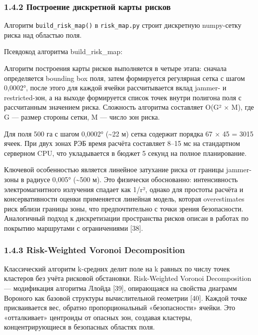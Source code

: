 \documentclass[14pt,a4paper]{extarticle}
\begin{document}
\hypertarget{ux43fux43eux441ux442ux440ux43eux435ux43dux438ux435-ux434ux438ux441ux43aux440ux435ux442ux43dux43eux439-ux43aux430ux440ux442ux44b-ux440ux438ux441ux43aux43eux432}{%
\subsubsection{1.4.2 Построение дискретной карты рисков}\label{ux43fux43eux441ux442ux440ux43eux435ux43dux438ux435-ux434ux438ux441ux43aux440ux435ux442ux43dux43eux439-ux43aux430ux440ux442ux44b-ux440ux438ux441ux43aux43eux432}}

Алгоритм \texttt{build\_risk\_map()} в \texttt{risk\_map.py} строит дискретную numpy-сетку риска над областью поля.

Псевдокод алгоритма build\_risk\_map:

Алгоритм построения карты рисков выполняется в четыре этапа: сначала определяется bounding box поля, затем формируется регулярная сетка с шагом 0,0002°, после этого для каждой ячейки рассчитывается вклад jammer- и restricted-зон, а на выходе формируется список точек внутри полигона поля с рассчитанным значением риска. Сложность алгоритма составляет O(G² × M), где G — размер стороны сетки, M — число зон риска.


Для поля 500 га с шагом 0,0002° (\textasciitilde22 м) сетка содержит порядка 67 × 45 = 3015 ячеек. При двух зонах РЭБ время расчёта составляет 8--15 мс на стандартном серверном CPU, что укладывается в бюджет 5 секунд на полное планирование.

Ключевой особенностью является линейное затухание риска от границы jammer-зоны в радиусе 0,005° (\textasciitilde500 м). Это физически обоснованно: интенсивность электромагнитного излучения спадает как 1/r², однако для простоты расчёта и консервативности оценки применяется линейная модель, которая overestimates риск вблизи границы зоны, что предпочтительно с точки зрения безопасности. Аналогичный подход к дискретизации пространства рисков описан в работах по покрытию маршрутами с ограничениями {[}38{]}.

\hypertarget{risk-weighted-voronoi-decomposition}{%
\subsubsection{1.4.3 Risk-Weighted Voronoi Decomposition}\label{risk-weighted-voronoi-decomposition}}

Классический алгоритм k-средних делит поле на k равных по числу точек кластеров без учёта рисковой обстановки. Risk-Weighted Voronoi Decomposition --- модификация алгоритма Ллойда {[}39{]}, опирающаяся на свойства диаграмм Вороного как базовой структуры вычислительной геометрии {[}40{]}. Каждой точке присваивается вес, обратно пропорциональный «безопасности» ячейки. Это «отталкивает» центроиды от опасных зон, создавая кластеры, концентрирующиеся в безопасных областях поля.
\end{document}
